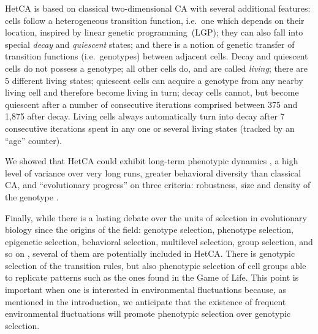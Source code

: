 HetCA \citep{medernach2013long} is based on classical two-dimensional CA with several additional features: cells follow a heterogeneous transition function, i.e.~one which depends on their location, inspired by linear genetic programming~(LGP); they can also fall into special \emph{decay} and \emph{quiescent} states; and there is a notion of genetic transfer of transition functions (i.e.~genotypes) between adjacent cells. Decay and quiescent cells do not possess a genotype; all other cells do, and are called \emph{living}; there are 5 different living states; quiescent cells can acquire a genotype from any nearby living cell and therefore become living in turn; decay cells cannot, but become quiescent after a number of consecutive iterations comprised between 375 and 1,875 after decay. Living cells always automatically turn into decay after 7 consecutive iterations spent in any one or several living states (tracked by an ``age'' counter).

We showed that HetCA could exhibit long-term phenotypic dynamics \citep{medernach2013long}, a high level of variance over very long runs, greater behavioral diversity than classical CA, and ``evolutionary progress'' \cite{shanahan2012evolutionary} on three criteria: robustness, size and density of the genotype \citep{medernach2015evolutionary}.

Finally, while there is a lasting debate over the units of selection in evolutionary biology since the origins of the field: genotype selection, phenotype selection, epigenetic selection, behavioral selection, multilevel selection, group selection, and so on \citep{lloyd2012unitsandlevelsofselection,okasha2006evolution}, several of them are potentially included in HetCA. There is genotypic selection of the transition rules, but also phenotypic selection of cell groups able to replicate patterns such as the ones found in the Game of Life. This point is important when one is interested in environmental fluctuations because, as mentioned in the introduction, we anticipate that the existence of frequent environmental fluctuations will promote phenotypic selection over genotypic selection.
